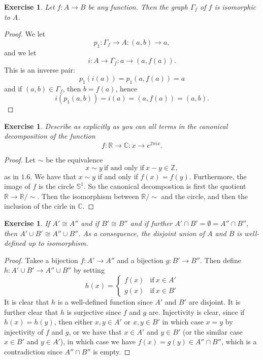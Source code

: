 \documentclass[a4paper, 11pt]{book}
\theoremstyle{plain}
\newtheorem{exercise}[theorem]{Exercise}
\theoremstyle{plain}
\begin{document}
\begin{exercise}
Let $f:A\rightarrow B$ be any function. Then the graph $\Gamma_f$ of $f$ is isomorphic to $A$.
\end{exercise}
\begin{proof}
We let
$$p_1:\Gamma_f\rightarrow A:(a,b)\rightarrow a,$$
and we let
$$i:A\rightarrow \Gamma_f:a\rightarrow (a,f(a)).$$
This is an inverse pair:
$$p_1(i(a)) = p_1(a,f(a)) = a$$
and if $(a,b)\in \Gamma_f$, then $b=f(a)$, hence
$$i(p_1(a,b)) = i(a) = (a,f(a)) = (a,b).$$
\end{proof}

\begin{exercise}
Describe as explicitly as you can all terms in the canonical decomposition of the function $$f:\mathbb{R}\rightarrow \mathbb{C}: x\rightarrow e^{2\pi i x}.$$
\end{exercise}
\begin{proof}
Let $\sim$ be the equivalence
$$x\sim y~\text{if and only if}~x-y\in \mathbb{Z},$$
as in $1.6$. We have that $x\sim y$ if and only if $f(x)=f(y)$. Furthermore, the image of $f$ is the circle $\mathbb{S}^1$. So the canonical decompostion is first the quotient $\mathbb{R}\rightarrow \mathbb{R}/\sim$. Then the isomorphism between $\mathbb{R}/\sim$ and the circle, and then the inclusion of the cirle in $\mathbb{C}$.
\end{proof}

\begin{exercise}
If $A'\cong A''$ and if $B'\cong B''$ and if further $A'\cap B' =\emptyset = A''\cap B''$, then $A'\cup B'\cong A''\cup B''$. As a consequence, the disjoint union of $A$ and $B$ is well-defined up to isomorphism.
\end{exercise}
\begin{proof}
Takee a bijection $f:A'\rightarrow A''$ and a bijection $g:B'\rightarrow B''$. Then define $h:A'\cup B'\rightarrow A''\cup B''$ by setting
$$h(x) = \left\{\begin{array}{ll}
f(x) & \text{if}~x\in A'\\
g(x) & \text{if}~x\in B' \end{array}\right.$$
It is clear that $h$ is a well-defined function since $A'$ and $B'$ are disjoint. It is further clear that $h$ is surjective since $f$ and $g$ are. Injectivity is clear, since if $h(x) = h(y)$, then either $x,y\in A'$ or $x,y\in B'$ in which case $x=y$ by injectivity of $f$ and $g$, or we have that $x\in A'$ and $y\in B'$ (or the similar case $x\in B'$ and $y\in A'$), in which case we have $f(x) = g(y)\in A''\cap B''$, which is a contradiction since $A''\cap B''$ is empty.
\end{proof}
\end{document}
